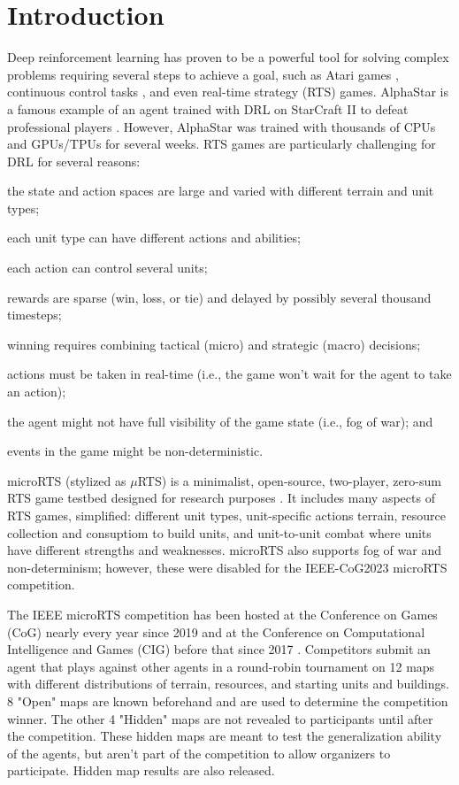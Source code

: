 \documentclass{article}
\begin{document}
\section{Introduction}
Deep reinforcement learning has proven to be a powerful tool for solving complex
problems requiring several steps to achieve a goal, such as Atari games \citep{DBLP:journals/corr/MnihKSGAWR13}, continuous
control tasks \citep{DBLP:journals/corr/LillicrapHPHETS15}, and even real-time strategy
(RTS) games. AlphaStar is a famous example of an agent trained with DRL on StarCraft
II to defeat professional players \citep{Vinyals2019GrandmasterLI}. However, AlphaStar was trained with thousands of
CPUs and GPUs/TPUs for several weeks. RTS games are particularly challenging for DRL for
several reasons:
\begin{inparaenum}[(1)]
    \item the state and action spaces are large and varied with different terrain and
        unit types;
    \item each unit type can have different actions and abilities;
    \item each action can control several units;
    \item rewards are sparse (win, loss, or tie) and delayed by possibly several
    thousand timesteps;
    \item winning requires combining tactical (micro) and strategic (macro) decisions;
    \item actions must be taken in real-time (i.e., the game won't wait for the agent to
        take an action);
    \item the agent might not have full visibility of the game state (i.e., fog of war); and
    \item events in the game might be non-deterministic.
\end{inparaenum}

microRTS (stylized as $\mu$RTS) is a minimalist, open-source, two-player, zero-sum RTS game testbed designed for research
purposes \citep{Ontan2013TheCM}. It includes many aspects of RTS games, simplified: different unit types, unit-specific
actions terrain, resource collection and consuptiom to build units, and unit-to-unit combat
where units have different strengths and weaknesses. microRTS also supports fog of war
and non-determinism; however, these were disabled for the IEEE-CoG2023 microRTS
competition.

The IEEE microRTS competition has been hosted at the Conference on Games (CoG) nearly
every year since 2019 and at the Conference on Computational Intelligence and Games
(CIG) before that since 2017 \citep{Ontañón_Barriga_Silva_Moraes_Lelis_2018}.
Competitors submit an agent that plays against other agents in a round-robin tournament
on 12 maps with different distributions of terrain, resources, and starting units and
buildings. 8 "Open" maps are known beforehand and are used to determine the competition winner.
The other 4 "Hidden" maps are not revealed to participants until after the competition.
These hidden maps are meant to test the generalization ability of the agents, but aren't
part of the competition to allow organizers to participate. Hidden map results are also
released.
\end{document}

